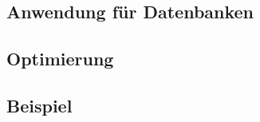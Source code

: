 \subsection{Anwendung für Datenbanken}

\subsection{Optimierung}
\cite{miner2012mapreduce}
\subsection{Beispiel}